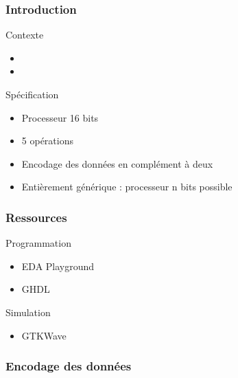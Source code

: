 \documentclass{beamer}
\begin{document}
\begin{frame}
\frametitle{Introduction}
\begin{block}{Contexte}
	\begin{itemize}
		\item 
		\item 
	\end{itemize}
\end{block}
\begin{block}{Spécification}
	\begin{itemize}
		\item Processeur 16 bits
		\item 5 opérations
		\item Encodage des données en complément à deux
		\item Entièrement générique : processeur n bits possible
	\end{itemize}
\end{block}
\end{frame}

\begin{frame}
\frametitle{Ressources} %
\begin{block}{Programmation}
	\begin{itemize}
		\item EDA Playground
		\item GHDL
	\end{itemize}
\end{block}
\begin{block}{Simulation}
	\begin{itemize}
		\item GTKWave
	\end{itemize}
\end{block}
\end{frame}

\begin{frame}
\frametitle{Encodage des données} %
\end{frame}
\end{document}
